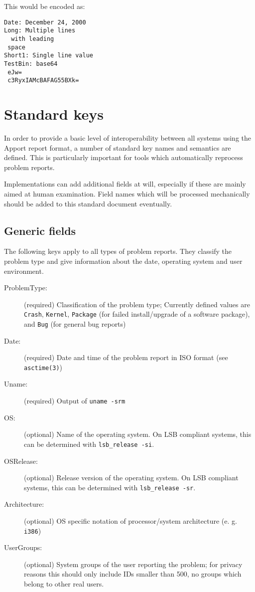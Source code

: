 \documentclass[DIV12,halfparskip]{scrartcl}
\begin{document}
This would be encoded as:

\begin{verbatim}
Date: December 24, 2000
Long: Multiple lines
  with leading
 space
Short1: Single line value
TestBin: base64
 eJw=
 c3RyxIAMcBAFAG55BXk=
\end{verbatim}

\section{Standard keys}

In order to provide a basic level of interoperability between all systems using
the Apport report format, a number of standard key names and semantics are
defined. This is particularly important for tools which automatically reprocess
problem reports.

Implementations can add additional fields at will, especially if these are
mainly aimed at human examination. Field names which will be processed
mechanically should be added to this standard document eventually.

\subsection{Generic fields}

The following keys apply to all types of problem reports. They classify the
problem type and give information about the date, operating system and user
environment.

\begin{description}
    \item [ProblemType:] (required) Classification of the problem type;
    Currently defined values are \verb!Crash!, \verb!Kernel!, \verb!Package!
    (for failed install/upgrade of a software package), and \verb!Bug! (for
    general bug reports)

    \item [Date:] (required) Date and time of the problem report in ISO format
    (see \verb!asctime(3)!)

    \item [Uname:] (required) Output of \verb!uname -srm!

    \item [OS:] (optional) Name of the operating system. On LSB compliant
    systems, this can be determined with \verb!lsb_release -si!.

    \item [OSRelease:] (optional) Release version of the operating system. On
    LSB compliant systems, this can be determined with \verb!lsb_release -sr!.

    \item [Architecture:] (optional) OS specific notation of
    processor/system architecture (e. g. \verb!i386!)

    \item [UserGroups:] (optional) System groups of the user reporting the
    problem; for privacy reasons this should only include IDs smaller than 500,
    no groups which belong to other real users.
\end{description}
\end{document}
